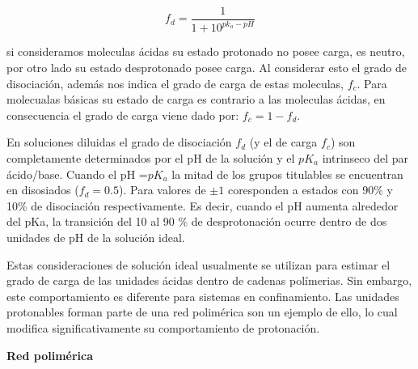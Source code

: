 \begin{equation}
    f_d = \frac{1}{1+10^{pk_a -pH}}
    \label{eq:diso}
\end{equation}

si consideramos moleculas \'acidas su estado protonado no posee carga, es  neutro, por otro lado su estado desprotonado posee carga. 
Al considerar esto el grado de disociaci\'on, adem\'as nos indica el grado de carga de estas moleculas, $f_c$.
Para molecualas b\'asicas su estado de carga es contrario a las moleculas \'acidas, en consecuencia el grado de carga viene dado por: $f_c =1- f_d$.

En soluciones diluidas el grado de disociaci\'on $f_d$ (y el de carga $f_c$) son completamente determinados por el pH de la soluci\'on y el $pK_a$ intrinseco del par \'acido/base. 
Cuando el pH =$pK_a$ la mitad de los grupos titulables se encuentran en disosiados ($f_d = 0.5$). Para valores de $\pm 1$ coresponden a estados con 90\% y 10\% de disociaci\'on respectivamente.
Es decir, cuando el pH aumenta alrededor del pKa, la transici\'on del 10 al 90 \% de desprotonaci\'on ocurre dentro de dos unidades de pH de la soluci\'on ideal. 

Estas consideraciones de soluci\'on ideal usualmente se utilizan para estimar el grado de carga de las unidades \'acidas dentro de cadenas pol\'imerias. Sin embargo, este comportamiento es diferente para sistemas  en confinamiento. Las unidades  protonables forman parte de una red polim\'erica son un ejemplo de ello, lo cual modifica significativamente su comportamiento de protonaci\'on.


\textbf{Red polim\'erica} \\

